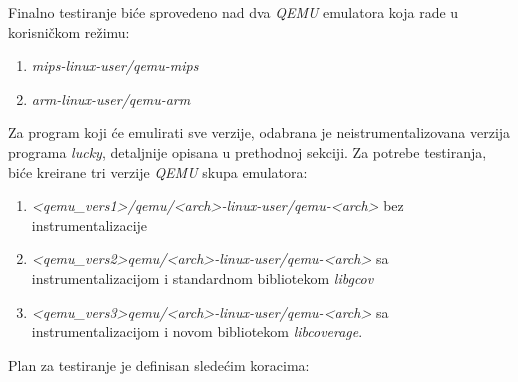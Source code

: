 \documentclass[12pt,oneside]{memoir}
\newcommand{\strano}[1]{\textit{#1}}
\begin{document}
Finalno testiranje biće sprovedeno nad dva \strano{QEMU} emulatora koja rade u korisničkom režimu:
\begin{enumerate}
\item \strano{mips-linux-user/qemu-mips}
\item \strano{arm-linux-user/qemu-arm}
\end{enumerate}
Za program koji će emulirati sve verzije, odabrana je neistrumentalizovana verzija programa \strano{lucky}, detaljnije opisana u prethodnoj sekciji.
Za potrebe testiranja, biće kreirane tri verzije \strano{QEMU} skupa emulatora:
\begin{enumerate}
\item \strano{<qemu\_vers1>/qemu/<arch>-linux-user/qemu-<arch>} bez instrumentalizacije
\item \strano{<qemu\_vers2>qemu/<arch>-linux-user/qemu-<arch>} sa instrumentalizacijom i standardnom bibliotekom \strano{libgcov}
\item \strano{<qemu\_vers3>qemu/<arch>-linux-user/qemu-<arch>} sa instrumentalizacijom i novom bibliotekom \strano{libcoverage}.
\end{enumerate}
Plan za testiranje je definisan sledećim koracima:
\end{document}
